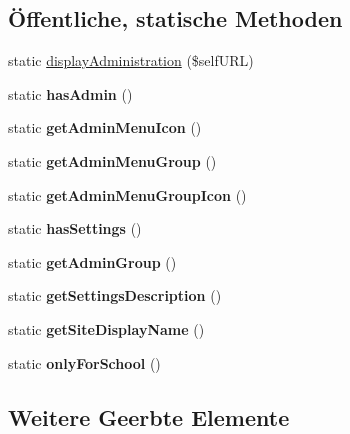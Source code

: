 \subsection*{Öffentliche, statische Methoden}
\begin{DoxyCompactItemize}
\item 
static \mbox{\hyperlink{classoffice365_a5a2709af207580f72593f1c046044845}{display\+Administration}} (\$self\+U\+RL)
\item 
\mbox{\label{classoffice365_a9c6845c87af8989ed5ad18dcc2b87c8e}} 
static {\bfseries has\+Admin} ()
\item 
\mbox{\label{classoffice365_a1ddf1740df5a45d056838dddd903c190}} 
static {\bfseries get\+Admin\+Menu\+Icon} ()
\item 
\mbox{\label{classoffice365_a2f388cee1a32f15c84e5fddbfd659eb0}} 
static {\bfseries get\+Admin\+Menu\+Group} ()
\item 
\mbox{\label{classoffice365_aa133ac295ee0b6344175bd5c6c6caedd}} 
static {\bfseries get\+Admin\+Menu\+Group\+Icon} ()
\item 
\mbox{\label{classoffice365_a710e405174c632b528d348f2f6b2fe36}} 
static {\bfseries has\+Settings} ()
\item 
\mbox{\label{classoffice365_a7b445e81adcfc94ec14dc166703f165e}} 
static {\bfseries get\+Admin\+Group} ()
\item 
\mbox{\label{classoffice365_aacbae55f37df69cf6c8af5b38073a782}} 
static {\bfseries get\+Settings\+Description} ()
\item 
\mbox{\label{classoffice365_ad28d7a87a8b1e8bd53939096384f079a}} 
static {\bfseries get\+Site\+Display\+Name} ()
\item 
\mbox{\label{classoffice365_a7e743749fb89fde98eed144c11f6b9b1}} 
static {\bfseries only\+For\+School} ()
\end{DoxyCompactItemize}
\subsection*{Weitere Geerbte Elemente}


